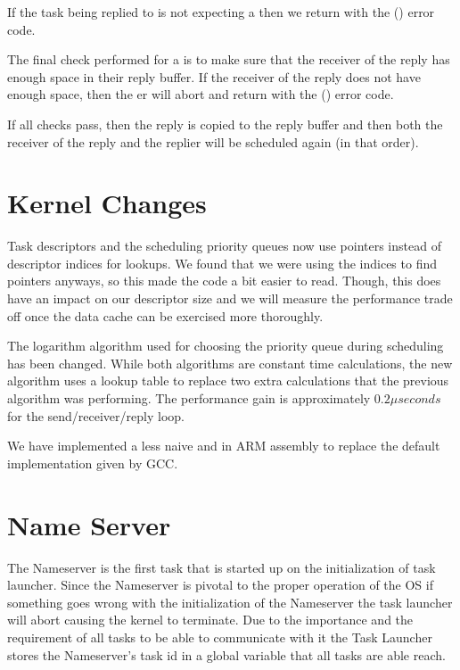 \documentclass[pdftex,10pt,a4paper]{article}
\begin{document}
If the task being replied to is not expecting a  then we
return with the  () error code.

The final check performed for a  is to make sure that the
receiver of the reply has enough space in their reply buffer. If the
receiver of the reply does not have enough space, then the
er will abort and return with the 
() error code.

If all checks pass, then the reply is copied to the reply buffer and
then both the receiver of the reply and the replier will be scheduled
again (in that order).

\section*{Kernel Changes}

Task descriptors and the scheduling priority queues now use pointers
instead of descriptor indices for lookups. We found that we were
using the indices to find pointers anyways, so this made the code a
bit easier to read. Though, this does have an impact on our descriptor
size and we will measure the performance trade off once the data cache
can be exercised more thoroughly.

The logarithm algorithm used for choosing the priority queue during
scheduling has been changed. While both algorithms are constant time
calculations, the new algorithm uses a lookup table to replace two
extra calculations that the previous algorithm was performing. The
performance gain is approximately $0.2 \mu seconds$ for the
send/receiver/reply loop.

We have implemented a less naive  and  in ARM
assembly to replace the default implementation given by GCC.

\section*{Name Server}

The Nameserver is the first task that is started up on the
initialization of task launcher. Since the Nameserver is pivotal to
the proper operation of the OS if something goes wrong with the
initialization of the Nameserver the task launcher will abort causing
the kernel to terminate. Due to the importance and the requirement of
all tasks to be able to communicate with it the Task Launcher stores
the Nameserver’s task id in a global variable that all tasks are able
reach.
\end{document}
